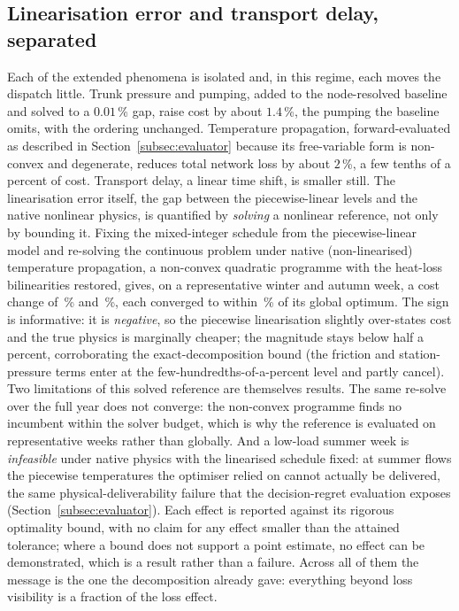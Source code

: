 \documentclass[a4paper,fleqn]{cas-sc}
\begin{document}
\subsection{Linearisation error and transport delay, separated}
\label{subsec:linearisation}
Each of the extended phenomena is isolated and, in this regime, each moves the dispatch little.
Trunk pressure and pumping, added to the node-resolved baseline and solved to a $0.01$\,\%
gap, raise cost by about $1.4$\,\%, the pumping the baseline omits, with the ordering
unchanged. Temperature propagation, forward-evaluated as described in Section~\ref{subsec:evaluator}
because its free-variable form is non-convex and degenerate, reduces total network loss by about
$2$\,\%, a few tenths of a percent of cost. Transport delay, a linear time shift, is smaller
still. The linearisation error itself, the gap between the piecewise-linear levels and the
native nonlinear physics, is quantified by \emph{solving} a nonlinear reference, not only by
bounding it. Fixing the mixed-integer schedule from the piecewise-linear model and re-solving the
continuous problem under native (non-linearised) temperature propagation, a non-convex quadratic
programme with the heat-loss bilinearities restored, gives, on a representative winter and autumn
week, a cost change of \,\% and \,\%,
each converged to within \,\% of its global optimum. The sign is
informative: it is \emph{negative}, so the piecewise linearisation slightly over-states cost and
the true physics is marginally cheaper; the magnitude stays below half a percent, corroborating
the exact-decomposition bound (the friction and station-pressure terms enter at the
few-hundredths-of-a-percent level and partly cancel). Two limitations of this solved reference are
themselves results. The same re-solve over the full year does not converge: the non-convex
programme finds no incumbent within the solver budget, which is why the reference is evaluated on
representative weeks rather than globally. And a low-load summer week is \emph{infeasible} under
native physics with the linearised schedule fixed: at summer flows the piecewise temperatures the
optimiser relied on cannot actually be delivered, the same physical-deliverability failure that the
decision-regret evaluation exposes (Section~\ref{subsec:evaluator}). Each effect is reported against
its rigorous optimality bound, with no claim for any effect smaller than the attained tolerance;
where a bound does not support a point estimate, no effect can be demonstrated, which is a
result rather than a failure. Across all of them the message is the one the decomposition
already gave: everything beyond loss visibility is a fraction of the loss effect.

\end{document}
